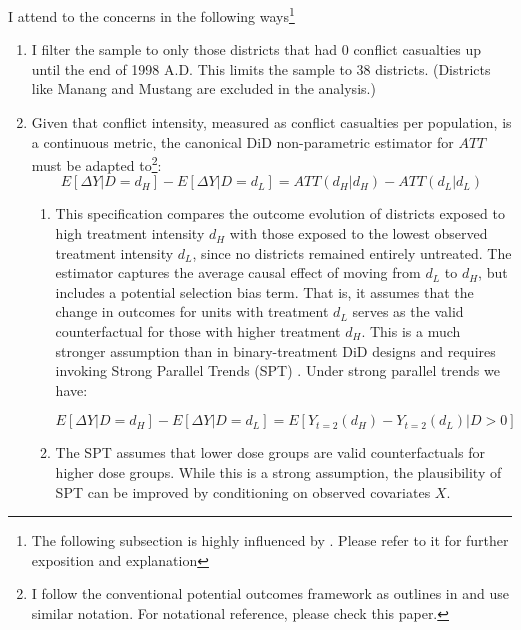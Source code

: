 \documentclass[12pt,a4paper]{article}
\begin{document}
I attend to the concerns in the following ways\footnote{The following subsection is highly influenced by \parencite{callaway2024difference}. Please refer to it for further exposition and explanation}

\begin{enumerate}
	\item I filter the sample to only those districts that had 0 conflict casualties up until the end of 1998 A.D. This limits the sample to 38 districts. (Districts like Manang and Mustang are excluded in the analysis.)
	
	\item Given that conflict intensity, measured as conflict casualties per population, is a continuous metric, the canonical DiD non-parametric estimator for $ATT$ must be adapted to\footnote{I follow the conventional potential outcomes framework as outlines in \parencite{baker2025difference} and use similar notation. For notational reference, please check this paper.}:
	\begin{equation}
		E[\Delta Y|D=d_{H}]-E[\Delta Y|D=d_{L}]=ATT(d_{H}|d_{H})-ATT(d_{L}|d_{L})
	\end{equation}
	\begin{enumerate}
		\item This specification compares the outcome evolution of districts exposed to high treatment intensity $d_H$ with those exposed to the lowest observed treatment intensity $d_L$, since no districts remained entirely untreated. The estimator captures the average causal effect of moving from $d_L$ to $d_H$, but includes a potential selection bias term. That is, it assumes that the change in outcomes for units with treatment $d_L$ serves as the valid counterfactual for those with higher treatment $d_H$. This is a much stronger assumption than in binary-treatment DiD designs and requires invoking Strong Parallel Trends (SPT) \parencite{callaway2024difference}. Under strong parallel trends we have:
		
		\begin{equation}
			E[\Delta Y|D=d_{H}]-E[\Delta Y|D=d_{L}]=E[Y_{t=2}(d_{H})-Y_{t=2}(d_{L})|D>0]
		\end{equation}
		
		\item The SPT assumes that lower dose groups are valid counterfactuals for higher dose groups. While this is a strong assumption, the plausibility of SPT can be improved by conditioning on observed covariates $X$.
	\end{enumerate}
	

\end{enumerate}
\end{document}
